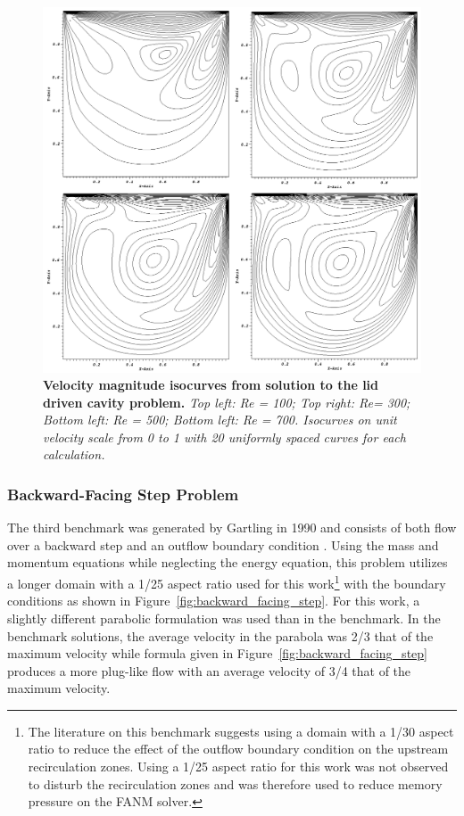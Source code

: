 \begin{figure}[t!]
  \begin{center}
    \includegraphics[width=6in]{chapters/nonlinear_problem/driven_velocity_isocurves.png}
  \end{center}
  \caption{\textbf{Velocity magnitude isocurves from solution to the
      lid driven cavity problem.} \textit{Top left: Re = 100; Top
      right: Re= 300; Bottom left: Re = 500; Bottom left: Re =
      700. Isocurves on unit velocity scale from 0 to 1 with 20
      uniformly spaced curves for each calculation.}}
  \label{fig:driven_velocity_isocurves}
\end{figure}

\clearpage

\subsubsection{Backward-Facing Step Problem}
\label{subsubsec:backward_facing_step}
The third benchmark was generated by Gartling in 1990 and consists of
both flow over a backward step and an outflow boundary condition
\citep{gartling_test_1990}. Using the mass and momentum equations
while neglecting the energy equation, this problem utilizes a longer
domain with a 1/25 aspect ratio used for this work\footnote{The
  literature on this benchmark suggests using a domain with a 1/30
  aspect ratio to reduce the effect of the outflow boundary condition
  on the upstream recirculation zones. Using a 1/25 aspect ratio for
  this work was not observed to disturb the recirculation zones and
  was therefore used to reduce memory pressure on the FANM solver.}
with the boundary conditions as shown in
Figure~\ref{fig:backward_facing_step}. For this work, a slightly
different parabolic formulation was used than in the benchmark. In the
benchmark solutions, the average velocity in the parabola was 2/3 that
of the maximum velocity while formula given in
Figure~\ref{fig:backward_facing_step} produces a more plug-like flow
with an average velocity of 3/4 that of the maximum velocity.

